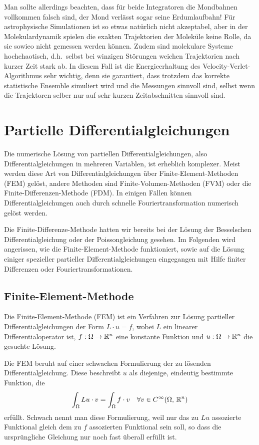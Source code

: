 Man sollte allerdings beachten, dass für beide Integratoren die
Mondbahnen vollkommen falsch sind, der Mond verlässt sogar seine
Erdumlaufbahn! Für astrophysische Simulationen ist so etwas natürlich
nicht akzeptabel, aber in der Molekulardynamik spielen die exakten
Trajektorien der Moleküle keine Rolle, da sie sowieo nicht gemessen
werden können. Zudem sind molekulare Systeme hochchaotisch, d.h.\
selbst bei winzigen Störungen weichen Trajektorien nach kurzer Zeit
stark ab. In diesem Fall ist die Energieerhaltung des
Velocity-Verlet-Algorithmus sehr wichtig, denn sie garantiert, dass
trotzdem das korrekte statistische Ensemble simuliert wird und die
Messungen sinnvoll sind, selbst wenn die Trajektoren selber nur auf
sehr kurzen Zeitabschnitten sinnvoll sind.

\section{Partielle Differentialgleichungen}

Die numerische Lösung von partiellen Differentialgleichungen, also
Differentialgleichungen in mehreren Variablen, ist erheblich
komplexer. Meist werden diese Art von Differentialgleichungen über
Finite-Element-Methoden (FEM) gelöst, andere Methoden sind
Finite-Volumen-Methoden (FVM) oder die Finite-Differenzen-Methode
(FDM). In einigen Fällen können Differentialgleichungen auch durch
schnelle Fouriertransformation numerisch gelöst werden.

Die Finite-Differenze-Methode hatten wir bereits bei der Lösung der
Besselschen Differentialgleichung oder der Poissongleichung gesehen.
Im Folgenden wird angerissen, wie die Finite-Element-Methode
funktioniert, sowie auf die Lösung einiger spezieller partieller
Differentialgleichungen eingegangen mit Hilfe finiter Differenzen oder
Fouriertransformationen.

\subsection{Finite-Element-Methode}

Die Finite-Element-Methode (FEM) ist ein Verfahren zur Lösung
partieller Differentialgleichungen der Form $L\cdot u = f$, wobei $L$
ein linearer Differentialoperator ist, $f:\Omega\to\mathbb{R}^n$ eine
konstante Funktion und $u:\Omega\to\mathbb{R}^n$ die gesuchte Lösung.

Die FEM beruht auf einer schwachen Formulierung der zu lösenden
Differentialgleichung. Diese beschreibt $u$ als diejenige, eindeutig
bestimmte Funktion, die
\begin{equation}
  \label{eq:fem}
  \int_\Omega Lu\cdot v = \int_\Omega f\cdot v\quad\forall v\in
  C^\infty(\Omega,\, \mathbb{R}^n)
\end{equation}
erfüllt. Schwach nennt man diese Formulierung, weil nur das zu $Lu$
assozierte Funktional gleich dem zu $f$ assozierten Funktional sein
soll, so dass die ursprüngliche Gleichung nur noch fast überall
erfüllt ist.


